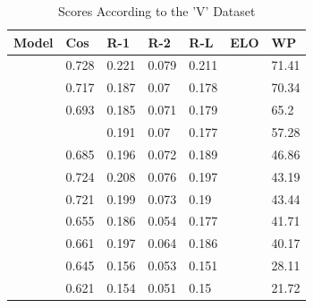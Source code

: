 \documentclass[conference]{IEEEtran}
\begin{document}
\begin{table}[htbp]
\caption{Scores According to the 'V' Dataset}
\begin{center}
\begin{tabular}{|p{2.5cm}|p{0.5cm}|p{0.5cm}|p{0.5cm}|p{0.5cm}|p{0.5cm}|p{0.5cm}|}
\hline
\centering \textbf{Model} & \textbf{Cos} & \textbf{R-1} & \textbf{R-2} & \textbf{R-L} & \textbf{ELO} & \textbf{WP} \\
\hline
\centering{Trendyol-LLM-7b-chat-v0.1} & 0.728 & 0.221 & 0.079 & 0.211 & \centering{1229} & 71.41 \\
\hline

\centering{Trendyol-LLM-7b-chat-dpo-v1.0} & 0.717 & 0.187 & 0.07 & 0.178 & \centering{1194} & 70.34 \\
\hline

\centering{SambaLingo-Turkish-Chat} & 0.693 & 0.185 & 0.071 & 0.179 & \centering{1163} & 65.2 \\
\hline
\centering{Turkcell-LLM-7b-v1} & \centering{0.693} & 0.191 & 0.07 & 0.177 & \centering{1107} & 57.28 \\
\hline
\centering{openchat\_3.5} & 0.685 & 0.196 & 0.072 & 0.189 & \centering{985} & 46.86 \\
\hline
\centering{cosmosGPT-Large-BM} & 0.724 & 0.208 & 0.076 & 0.197 & \centering{969} & 43.19 \\
\hline
\centering{cosmosGPT-Large-MH} & 0.721 & 0.199 & 0.073 & 0.19 & \centering{948} & 43.44 \\
\hline
\centering{cosmosGPT-Medium-MH} & 0.655 & 0.186 & 0.054 & 0.177 & \centering{933} & 41.71 \\
\hline
\centering{cosmosGPT-Medium-BM} & 0.661 & 0.197 & 0.064 & 0.186 & \centering{919} & 40.17 \\
\hline
\centering{gemma-7b-it} & 0.645 & 0.156 & 0.053 & 0.151 & \centering{829} & 28.11 \\
\hline
\centering{gemma-2b-it} & 0.621 & 0.154 & 0.051 & 0.15 & \centering{730} & 21.72 \\
\hline
\end{tabular}
\label{modeller22v}
\end{center}
\end{table}
\end{document}
